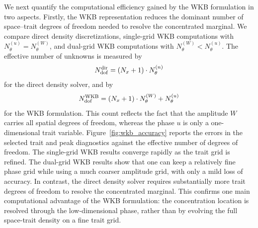\documentclass[11pt]{article}
\begin{document}
%





We next quantify the computational efficiency gained by the WKB formulation in two aspects.  
Firstly, the WKB representation reduces the
dominant number of space--trait degrees of freedom needed to resolve the
concentrated marginal.  
We compare direct density discretizations, single-grid WKB computations with \(N_\theta^{(u)}=N_\theta^{(W)}\), and dual-grid WKB computations with \(N_\theta^{(W)}<N_\theta^{(u)}\). The effective number of unknowns is measured by 
\[ N_{\rm dof}^{\rm dir}=(N_x+1) \cdot N_\theta^{(n)} \]
 for the direct density solver, and by 
 \[ N_{\rm dof}^{\rm WKB}=(N_x+1)\cdot N_\theta^{(W)}+ N_\theta^{(u)} \]
  for the WKB formulation. This count reflects the fact that the amplitude \(W\) carries all spatial degrees of freedom, whereas the phase \(u\) is only a one-dimensional trait variable. Figure~\ref{fig:wkb_accuracy} reports the errors in the selected trait and peak diagnostics against the effective number of degrees of freedom. The single-grid WKB results converge rapidly as the trait grid is refined. The dual-grid WKB results show that one can keep a relatively fine phase grid while using a much coarser amplitude grid, with only a mild loss of accuracy. In contrast, the direct density solver requires substantially more trait degrees of freedom to resolve the concentrated marginal. This confirms one main computational advantage of the WKB formulation: the concentration location is resolved through the low-dimensional phase, rather than by evolving the full space-trait density on a fine trait grid.
\end{document}
